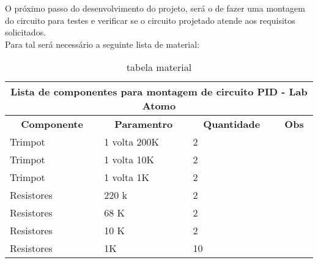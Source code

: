 O próximo passo do desenvolvimento do projeto, será o de fazer uma montagem do circuito para testes e verificar se o circuito projetado atende aos requisitos solicitados.  \\

Para tal será necessário a seguinte lista de material:

\begin{table}[H]
\centering
\caption{tabela material }
\label{Lista de Componentes}
\begin{tabular}{|l|l|l|l|}
\hline
\multicolumn{4}{|c|}{\cellcolor[HTML]{FFCCC9}\textbf{Lista de componentes para montagem de circuito PID - Lab Atomo}}                                               \\ \hline
\multicolumn{1}{|c|}{\textbf{Componente}} & \multicolumn{1}{c|}{\textbf{Paramentro}} & \multicolumn{1}{c|}{\textbf{Quantidade}} & \multicolumn{1}{c|}{\textbf{Obs}} \\ \hline
Trimpot                                   & 1 volta 200K                             & 2                                        &                                   \\ \hline
Trimpot                                   & 1 volta 10K                              & 2                                        &                                   \\ \hline
Trimpot                                   & 1 volta 1K                               & 2                                        &                                   \\ \hline
Resistores                                & 220 k                                    & 2                                        &                                   \\ \hline
Resistores                                & 68 K                                     & 2                                        &                                   \\ \hline
Resistores                                & 10 K                                     & 2                                        &                                   \\ \hline
Resistores                                & 1K                                       & 10                                       &                                   \\ \hline

\end{tabular}
\end{table}
